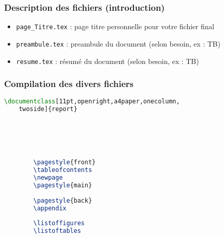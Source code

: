 \begin{frame}[containsverbatim]
    \frametitle{Description des fichiers (introduction)}
    \begin{itemize}[label=$\triangleright$]
        \item \texttt{page\_Titre.tex} : page titre personnelle pour votre fichier final
        \item \texttt{preambule.tex} : preambule du document (selon besoin, ex : TB)
        \item \texttt{resume.tex} : résumé du document (selon besoin, ex : TB)
    \end{itemize}
\end{frame}

\begin{frame}[containsverbatim]
    \frametitle{Compilation des divers fichiers}
    \begin{lstlisting}[language=TeX]
    \documentclass[11pt,openright,a4paper,onecolumn,
    twoside]{report}
    
    
    
    
    
        
        \pagestyle{front}  
        \tableofcontents
        \newpage
        \pagestyle{main}
            
        \pagestyle{back}
        \appendix
        
        \listoffigures
        \listoftables
    
    \end{lstlisting}
\end{frame}

